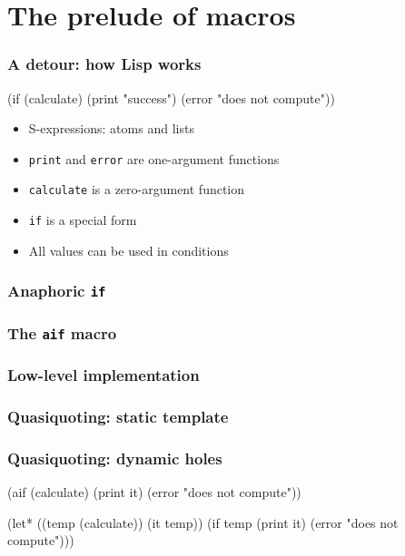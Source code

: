 \documentclass[hyperref={bookmarks=false}]{beamer}
\begin{document}


\section{The prelude of macros}

\begin{frame}[fragile]
\frametitle{A detour: how Lisp works}
\begin{semiverbatim}
(if (calculate)
  (print "success")
  (error "does not compute"))
\end{semiverbatim}

\vskip50pt

\begin{itemize}
\item S-expressions: atoms and lists
\item \texttt{print} and \texttt{error} are one-argument functions
\item \texttt{calculate} is a zero-argument function
\item \texttt{if} is a special form
\item All values can be used in conditions
\end{itemize}
\end{frame}

\begin{frame}[fragile]
\frametitle<1>{Anaphoric \texttt{if}}
\frametitle<2>{The \texttt{aif} macro}
\frametitle<3>{Low-level implementation}
\frametitle<4>{Quasiquoting: static template}
\frametitle<5>{Quasiquoting: dynamic holes}
\begin{semiverbatim}
(aif (calculate)
  (print it)
  (error "does not compute"))


(let* ((temp (calculate))
       (it temp))
  (if temp
    (print it)
    (error "does not compute")))
\end{semiverbatim}
\end{frame}
\end{document}
